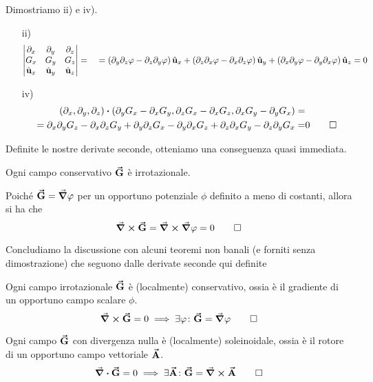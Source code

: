 \begin{demonstration}
	Dimostriamo ii) e iv).
	\begin{itemize}
		\item[ii)]
		\begin{align*}
			\begin{vmatrix}
				\partial_x & \partial_y & \partial_z\\
				G_x & G_y & G_z\\
				\hat{\mathbf{u}}_x & \hat{\mathbf{u}}_y & \hat{\mathbf{u}}_z
			\end{vmatrix}&=\
		&=\left(\partial_y\partial_z\varphi-\partial_z\partial_y\varphi\right)\hat{\mathbf{u}}_x+\left(\partial_z\partial_x\varphi-\partial_x\partial_z\varphi\right)\hat{\mathbf{u}}_y+\left(\partial_x\partial_y\varphi-\partial_y\partial_x\varphi\right)\hat{\mathbf{u}}_z=0
		\end{align*}
		\item[iv)]
		\begin{align*}
			\left(\partial_x,\partial_y,\partial_z\right)\vdot(\partial_yG_x-\partial_xG_y,\partial_zG_x-\partial_xG_z,\partial_xG_y-\partial_yG_x)=&\\
			=\partial_x\partial_yG_z-\partial_x\partial_zG_y+\partial_y\partial_zG_x-\partial_y\partial_xG_z+\partial_z\partial_xG_y-\partial_z\partial_yG_x=&0\qedhere
		\end{align*}
	\end{itemize}
\end{demonstration}
Definite le nostre derivate seconde, otteniamo una conseguenza quasi immediata.
\begin{proposition}
	Ogni campo conservativo $\vb*{\va{G}}$ è irrotazionale.
\end{proposition}
\begin{demonstration}
	Poiché $\vb*{\va{G}}=\grad{\varphi}$ per un opportuno potenziale $\phi$ definito a meno di costanti, allora si ha che
	\begin{equation*}
		\curl{\vb*{\va{G}}}=\curl{\grad{\varphi}}=0\qedhere
	\end{equation*}
\end{demonstration}
Concludiamo la discussione con alcuni teoremi non banali (e forniti senza dimostrazione) che seguono dalle derivate seconde qui definite
\begin{theoremaqed}
	Ogni campo irrotazionale $\vb*{\va{G}}$ è (localmente) conservativo, ossia è il gradiente di un opportuno campo scalare $\phi$.
	\begin{equation*}
		\curl{\vb*{\va{G}}}=0\implies \exists \varphi\colon \vb*{\va{G}}=\grad{\varphi}\qedhere
	\end{equation*}
\end{theoremaqed}
\begin{theoremaqed}
	Ogni campo $\vb*{\va{G}}$ con divergenza nulla è (localmente) soleinoidale, ossia è il rotore di un opportuno campo vettoriale $\vb*{\va{A}}$.
	\begin{equation*}
		\div{\vb*{\va{G}}}=0\implies \exists \vb*{\va{A}}\colon \vb*{\va{G}}=\curl{\vb*{\va{A}}}\qedhere
	\end{equation*}
\end{theoremaqed}
